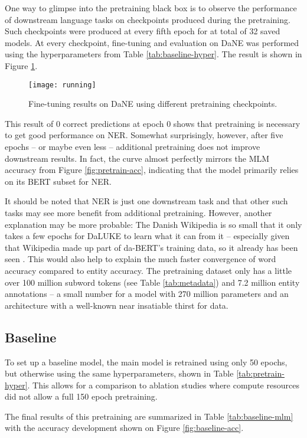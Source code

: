\documentclass[main.tex]{subfiles}
\begin{document}
One way to glimpse into the pretraining black box is to observe the performance of downstream language tasks on checkpoints produced during the pretraining.
Such checkpoints were produced at every fifth epoch for at total of 32 saved models.
At every checkpoint, fine-tuning and evaluation on DaNE was performed using the hyperparameters from Table \ref{tab:baseline-hyper}.
The result is shown in Figure \ref{fig:running}.
\begin{figure}[H]
    \centering
    \texttt{[image: running]}
    \caption{Fine-tuning results on DaNE using different pretraining checkpoints.}
    \label{fig:running}
\end{figure}\noindent
This result of 0 correct predictions at epoch 0 shows that pretraining is necessary to get good performance on NER.
Somewhat surprisingly, however, after five epochs -- or maybe even less -- additional pretraining does not improve downstream results.
In fact, the curve almost perfectly mirrors the MLM accuracy from Figure \ref{fig:pretrain-acc}, indicating that the model primarily relies on its BERT subset for NER.

It should be noted that NER is just one downstream task and that other such tasks may see more benefit from additional pretraining.
However, another explanation may be more probable:
The Danish Wikipedia is so small that it only takes a few epochs for DaLUKE to learn what it can from it -- especially given that Wikipedia made up part of da-BERT's training data, so it already has been seen \cite{botxo2019dabert}.
This would also help to explain the much faster convergence of word accuracy compared to entity accuracy.
The pretraining dataset only has a little over 100 million subword tokens (see Table \ref{tab:metadata}) and 7.2 million entity annotations -- a small number for a model with 270 million parameters and an architecture with a well-known near insatiable thirst for data.

\subsection{Baseline}
\label{subsec:baseline}
To set up a baseline model, the main model is retrained using only 50 epochs, but otherwise using the same hyperparameters, shown in Table \ref{tab:pretrain-hyper}.
This allows for a comparison to ablation studies where compute resources did not allow a full 150 epoch pretraining.

The final results of this pretraining are summarized in Table \ref{tab:baseline-mlm} with the accuracy development shown on Figure \ref{fig:baseline-acc}.
\end{document}

